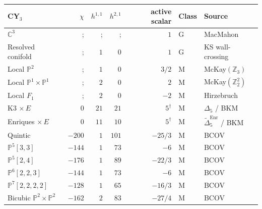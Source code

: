 \begin{table}[htbp]
\centering
\caption{Grand atlas of CY$_3$ shadow invariants. Columns: CY$_3$ family, topological Euler characteristic~$\chi$, Hodge numbers $h^{1,1}$ and $h^{2,1}$, active scalar lane, shadow depth class, and data source. For non-compact toric CY$_3$: the active scalar is $\kappa_{\mathrm{ch}} = \chi(S)/2$ where $S$ is the compact base (Proposition~\ref{prop:toric-kappa-table}). For compact CICYs: the active scalar is the BCOV shadow scalar $\kappa_{\mathrm{ch}}^{\mathrm{BCOV}} = \chi_{\mathrm{top}}/24$, not the Hodge-supertrace $\kappa_{\mathrm{ch}}$. For Borcherds-admissible K3-fibre rows: the column records $\kappa_{\mathrm{BKM}}$ (the automorphic weight), not $\kappa_{\mathrm{ch}}$; see Remark~\ref{rem:z2-quotient-kappa}. Families above the first rule are non-compact toric; between the rules are K3-fibre Borcherds rows; below are compact complete intersections and special families. BV = Borcea--Voisin.}
\label{tab:cy3-grand-atlas}
\small
\begin{longtable}{@{}lrrrrll@{}}
\toprule
CY$_3$ & $\chi$ & $h^{1,1}$ & $h^{2,1}$ & active scalar & Class & Source \\
\midrule
$\mathbb{C}^3$ &; &; &; & $1$ & G & MacMahon \\
Resolved conifold &; & $1$ & $0$ & $1$ & G & KS wall-crossing \\
Local $\mathbb{P}^2$ &; & $1$ & $0$ & $3/2$ & M & McKay$({\mathbb{Z}_3})$ \\
Local $\mathbb{P}^1 \!\times\! \mathbb{P}^1$ &; & $2$ & $0$ & $2$ & M & McKay$({\mathbb{Z}_2^2})$ \\
Local $F_1$ &; & $2$ & $0$ & $-2$ & M & Hirzebruch \\
\midrule
K3 $\times\, E$ & $0$ & $21$ & $21$ & $5^{\dagger}$ & M & $\Delta_5$ / BKM \\
Enriques $\times\, E$ & $0$ & $11$ & $10$ & $5^{\dagger}$ & M & $\widetilde\Delta^{\mathrm{Enr}}_5$ / BKM \\
\midrule
Quintic & $-200$ & $1$ & $101$ & $-25/3$ & M & BCOV \\
$\mathbb{P}^5[3,3]$ & $-144$ & $1$ & $73$ & $-6$ & M & BCOV \\
$\mathbb{P}^5[2,4]$ & $-176$ & $1$ & $89$ & $-22/3$ & M & BCOV \\
$\mathbb{P}^6[2,2,3]$ & $-144$ & $1$ & $73$ & $-6$ & M & BCOV \\
$\mathbb{P}^7[2,2,2,2]$ & $-128$ & $1$ & $65$ & $-16/3$ & M & BCOV \\
Bicubic $\mathbb{P}^2 \!\times\! \mathbb{P}^2$ & $-162$ & $2$ & $83$ & $-27/4$ & M & BCOV \\

\end{longtable}
\end{table}
